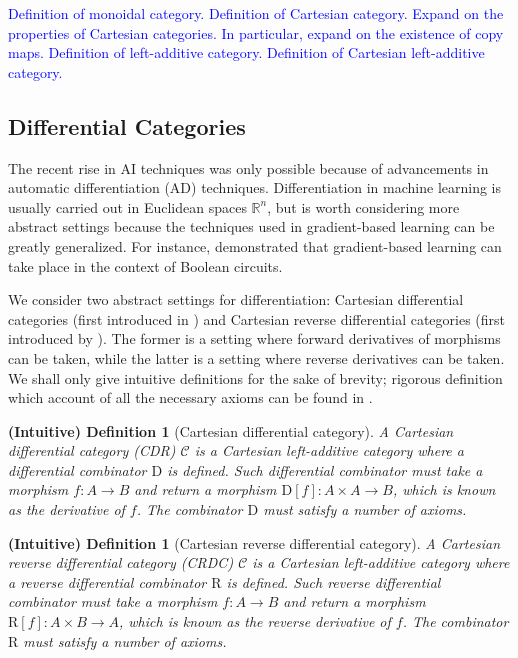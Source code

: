 \documentclass[12pt,a4paper,openright,twoside]{report}
\theoremstyle{plain}
\newtheorem{intdef}[prop]{(Intuitive) Definition}
\theoremstyle{definition}
\begin{document}
  \textcolor{blue}{Definition of monoidal category.}
  \textcolor{blue}{Definition of Cartesian category.}
  \textcolor{blue}{Expand on the properties of Cartesian categories. In particular, expand on the existence of copy maps.}
  \textcolor{blue}{Definition of left-additive category.}
  \textcolor{blue}{Definition of Cartesian left-additive category.}




  \subsection{Differential Categories}

  The recent rise in AI techniques was only possible because of advancements in automatic differentiation (AD) techniques. Differentiation in machine learning is usually carried out in Euclidean spaces $\mathbb{R}^n$, but is worth considering more abstract settings because the techniques used in gradient-based learning can be greatly generalized. For instance, \cite{wilsonReverseDerivativeAscent2021a} demonstrated that gradient-based learning can take place in the context of Boolean circuits.


  We consider two abstract settings for differentiation: Cartesian differential categories (first introduced in \cite{bluteDifferentialCategories2006}) and Cartesian reverse differential categories (first introduced by \cite{cockettReverseDerivativeCategories2019}). The former is a setting where forward derivatives of morphisms can be taken, while the latter is a setting where reverse derivatives can be taken. We shall only give intuitive definitions for the sake of brevity; rigorous definition which account of all the necessary axioms can be found in \cite{cockettReverseDerivativeCategories2019}.

  \begin{intdef}[Cartesian differential category]
    A Cartesian differential category (CDR) $\mathcal{C}$ is a Cartesian left-additive category where a differential combinator $\mathrm{D}$ is defined. Such differential combinator must take a morphism $f: A \to B$ and return a morphism $\mathrm{D}[f]: A \times A \to B$, which is known as the derivative of $f$. The combinator $\mathrm{D}$ must satisfy a number of axioms. 
  \end{intdef}

  \begin{intdef}[Cartesian reverse differential category]
    A Cartesian reverse differential category (CRDC) $\mathcal{C}$ is a Cartesian left-additive category where a reverse differential combinator $\mathrm{R}$ is defined. Such reverse differential combinator must take a morphism $f: A \to B$ and return a morphism $\mathrm{R}[f]: A \times B \to A$, which is known as the reverse derivative of $f$. The combinator $\mathrm{R}$ must satisfy a number of axioms. 
  \end{intdef}
\end{document}
